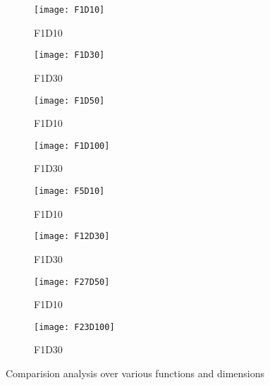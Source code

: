 \begin{figure*}[hptb]
    \centering
    \begin{subfigure}[b]{0.30\textwidth}
        \texttt{[image: F1D10]}
        \caption{F1D10}
    \end{subfigure}
    \begin{subfigure}[b]{0.30\textwidth}
        \texttt{[image: F1D30]}
        \caption{F1D30}
    \end{subfigure}    
    \begin{subfigure}[b]{0.30\textwidth}
        \texttt{[image: F1D50]}
        \caption{F1D10}
    \end{subfigure}

    \begin{subfigure}[b]{0.30\textwidth}
        \texttt{[image: F1D100]}
        \caption{F1D30}
    \end{subfigure}    
    \begin{subfigure}[b]{0.30\textwidth}
        \texttt{[image: F5D10]}
        \caption{F1D10}
    \end{subfigure}
    \begin{subfigure}[b]{0.30\textwidth}
        \texttt{[image: F12D30]}
        \caption{F1D30}
    \end{subfigure}
        
    \begin{subfigure}[b]{0.30\textwidth}
        \texttt{[image: F27D50]}
        \caption{F1D10}
    \end{subfigure}
    \begin{subfigure}[b]{0.30\textwidth}
        \texttt{[image: F23D100]}
        \caption{F1D30}
    \end{subfigure}

    \caption{Comparision analysis over various functions and dimensions}
    \vspace{-4mm}
\end{figure*}

